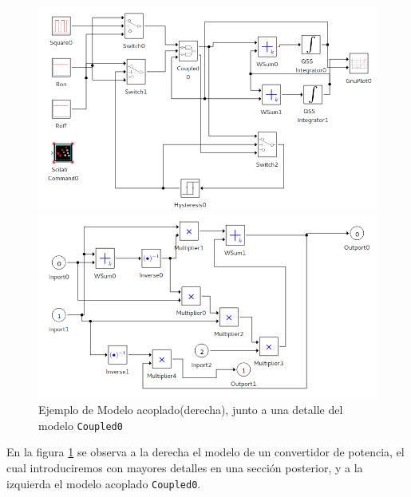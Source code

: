 \begin{figure}[H]
        \begin{minipage}{0.5\textwidth}
        \includegraphics[width=\linewidth]{buck_disk}
        \end{minipage}
        \begin{minipage}{0.5\textwidth}
        \includegraphics[width=\linewidth]{buck_disk_coupled0}
        \end{minipage}
 \label{fig:coupledsample}
 \caption{Ejemplo de Modelo acoplado(derecha), junto a una detalle del modelo \texttt{Coupled0}}
\end{figure}

        En la figura \ref{fig:coupledsample}  se observa a la derecha el modelo de un convertidor de potencia, el cual introduciremos con mayores
	 detalles en una sección posterior, y a la izquierda el modelo acoplado \texttt{Coupled0}.

